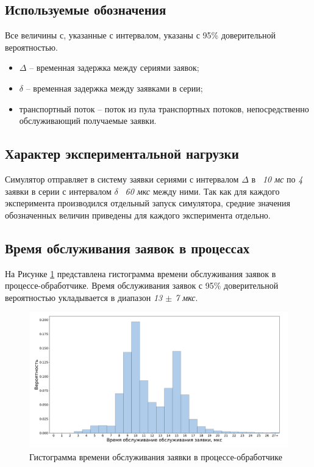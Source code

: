 \subsection{Используемые обозначения}

Все величины с, указанные с интервалом, указаны с 95\% доверительной вероятностью.

\begin{itemize}
\item $\Delta$ -- временная задержка между сериями заявок;
\item $\delta$ -- временная задержка между заявками в серии;
\item транспортный поток -- поток из пула транспортных потоков, непосредственно обслуживающий получаемые заявки.
\end{itemize}

\subsection{Характер экспериментальной нагрузки}

Симулятор отправляет в систему заявки сериями с интервалом $\Delta$ в \textit{~10 мс} по \textit{4} заявки в серии с интервалом $\delta$ \textit{~60 мкс} между ними. Так как для каждого эксперимента производился отдельный запуск симулятора, средние значения обозначенных величин приведены для каждого эксперимента отдельно.

\subsection{Время обслуживания заявок в процессах}

На Рисунке \ref{chapter41:EngineLatency} представлена гистограмма времени обслуживания заявок в процессе-обработчике. Время обслуживания заявок с 95\% доверительной вероятностью укладывается в диапазон \textit{13 $\pm$ 7 мкс}.
\begin{figure}[!h]
\caption{Гистограмма времени обслуживания заявки в процессе-обработчике}
\label{chapter41:EngineLatency}
\includegraphics[width=\textwidth]{../../graphics/hist/Engine}
\end{figure}

